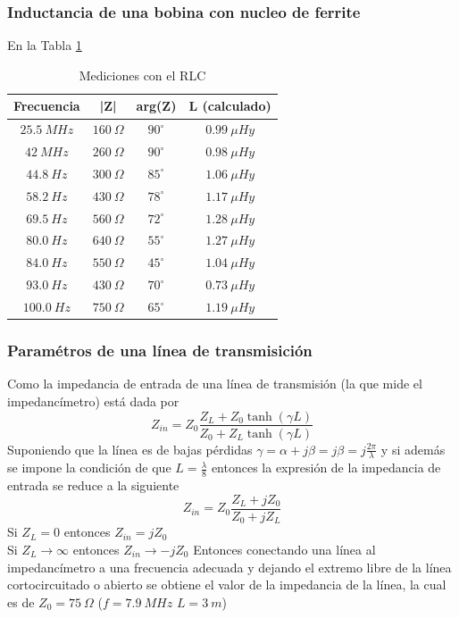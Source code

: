 \documentclass[a4paper,10pt]{article}
\begin{document}
		\subsubsection{Inductancia de una bobina con nucleo de ferrite}
		En la Tabla \ref{tabIMPbobina}
		\begin{table}[!htp]
			\centering
			\begin{tabular}{|c|c|c|c|}
				\hline
				Frecuencia & |Z| & arg(Z)  & L (calculado) \\
				\hline
				$25.5~MHz$ & $160~\Omega$ & $90^{\circ}$ & $0.99~\mu Hy$ \\
				\hline
				$42~MHz$ & $260~\Omega$ & $90^{\circ}$ & $0.98~\mu Hy$\\
				\hline
				$44.8~Hz$ & $300~\Omega$ & $85^{\circ}$ & $1.06~\mu Hy$ \\
				\hline
				$58.2~Hz$ & $430~\Omega$ & $78^{\circ}$ & $1.17~\mu Hy$ \\
				\hline									
				$69.5~Hz$ & $560~\Omega$ & $72^{\circ}$ & $1.28~\mu Hy$ \\
				\hline									
				$80.0~Hz$& $640~\Omega$ & $55^{\circ}$ & $1.27~\mu Hy$ \\
				\hline									
				$84.0~Hz$ & $550~\Omega$ & $45^{\circ}$ & $1.04~\mu Hy$ \\
				\hline									
				$93.0~Hz$ & $430~\Omega$ & $70^{\circ}$ & $0.73~\mu Hy$ \\
				\hline									
				$100.0~Hz$ & $750~\Omega$ & $65^{\circ}$ & $1.19~\mu Hy$ \\
				\hline			
			\end{tabular}
			\caption{Mediciones con el RLC} \label{tabIMPbobina}
		\end{table}	
					
		\subsubsection{Param\'etros de una l\'inea de transmisici\'on}
		Como la impedancia de entrada de una l\'inea de transmisi\'on (la que mide el impedanc\'imetro) est\'a dada por $$Z_{in}=Z_0\frac{Z_L+Z_0\tanh(\gamma L)}{Z_0+Z_L\tanh(\gamma L)}$$
		Suponiendo que la l\'inea es de bajas p\'erdidas $\gamma=\alpha+j\beta=j\beta=j\frac{2\pi}{\lambda}$ y si adem\'as se impone la condici\'on de que $L=\frac{\lambda}{8}$ entonces la expresi\'on de la impedancia de entrada se reduce a la siguiente
		$$Z_{in}=Z_0\frac{Z_L+jZ_0}{Z_0+jZ_L}$$
		Si $Z_L= 0$ entonces $Z_{in}=jZ_0$ \\
		Si $Z_L \rightarrow \infty$ entonces $Z_{in}\rightarrow-jZ_0$
		Entonces conectando una l\'inea al impedanc\'imetro a una frecuencia adecuada y dejando el extremo libre de la l\'inea cortocircuitado o abierto se obtiene el valor de la impedancia de la l\'inea, la cual es de $Z_0=75~\Omega$ ($f=7.9~MHz$ $L=3~m$)
		
\end{document}
